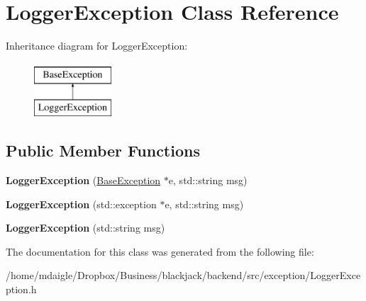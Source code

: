 \hypertarget{classLoggerException}{
\section{\-Logger\-Exception \-Class \-Reference}
\label{classLoggerException}
}
\-Inheritance diagram for \-Logger\-Exception\-:\begin{figure}[H]
\begin{center}
\leavevmode
\includegraphics[height=2.000000cm]{classLoggerException}
\end{center}
\end{figure}
\subsection*{\-Public \-Member \-Functions}
\begin{DoxyCompactItemize}
\item 
\hypertarget{classLoggerException_a9020de012158cb1a60f0afb4f480ccae}{
{\bfseries \-Logger\-Exception} (\hyperlink{classBaseException}{\-Base\-Exception} $\ast$e, std\-::string msg)}
\label{classLoggerException_a9020de012158cb1a60f0afb4f480ccae}

\item 
\hypertarget{classLoggerException_a3ae0a9072ae2947d0a99aaba41ba8429}{
{\bfseries \-Logger\-Exception} (std\-::exception $\ast$e, std\-::string msg)}
\label{classLoggerException_a3ae0a9072ae2947d0a99aaba41ba8429}

\item 
\hypertarget{classLoggerException_af187d81db3cf6fccce46ea4849d47ee7}{
{\bfseries \-Logger\-Exception} (std\-::string msg)}
\label{classLoggerException_af187d81db3cf6fccce46ea4849d47ee7}

\end{DoxyCompactItemize}


\-The documentation for this class was generated from the following file\-:\begin{DoxyCompactItemize}
\item 
/home/mdaigle/\-Dropbox/\-Business/blackjack/backend/src/exception/\-Logger\-Exception.\-h\end{DoxyCompactItemize}
